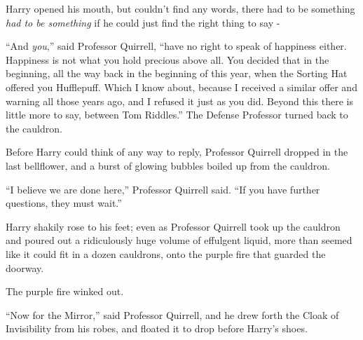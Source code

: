 Harry opened his mouth, but couldn't find any words, there had to be something \emph{had to be something} if he could just find the right thing to say -

``And \emph{you},'' said Professor Quirrell, ``have no right to speak of happiness either. Happiness is not what you hold precious above all. You decided that in the beginning, all the way back in the beginning of this year, when the Sorting Hat offered you Hufflepuff. Which I know about, because I received a similar offer and warning all those years ago, and I refused it just as you did. Beyond this there is little more to say, between Tom Riddles.'' The Defense Professor turned back to the cauldron.

Before Harry could think of any way to reply, Professor Quirrell dropped in the last bellflower, and a burst of glowing bubbles boiled up from the cauldron.

``I believe we are done here,'' Professor Quirrell said. ``If you have further questions, they must wait.''

Harry shakily rose to his feet; even as Professor Quirrell took up the cauldron and poured out a ridiculously huge volume of effulgent liquid, more than seemed like it could fit in a dozen cauldrons, onto the purple fire that guarded the doorway.

The purple fire winked out.

``Now for the Mirror,'' said Professor Quirrell, and he drew forth the Cloak of Invisibility from his robes, and floated it to drop before Harry's shoes.
